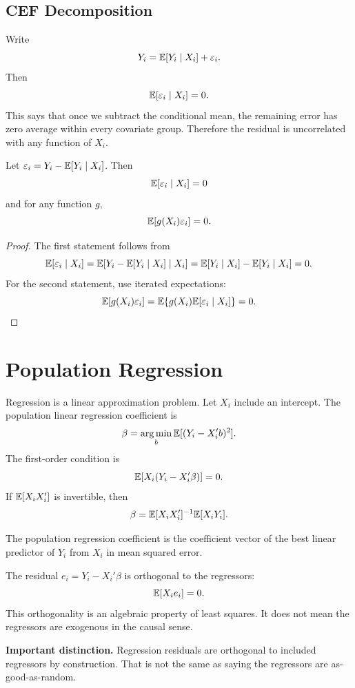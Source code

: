 \subsection{CEF Decomposition}

Write
\[
    Y_i = \mathbb{E}[Y_i\mid X_i] + \varepsilon_i.
\]
Then
\[
    \mathbb{E}[\varepsilon_i\mid X_i]=0.
\]
This says that once we subtract the conditional mean, the remaining error has
zero average within every covariate group. Therefore the residual is uncorrelated
with any function of \(X_i\).

\begin{thmN}
Let \(\varepsilon_i=Y_i-\mathbb{E}[Y_i\mid X_i]\). Then
\[
    \mathbb{E}[\varepsilon_i\mid X_i]=0
\]
and for any function \(g\),
\[
    \mathbb{E}[g(X_i)\varepsilon_i]=0.
\]
\end{thmN}

\begin{proof}
The first statement follows from
\[
    \mathbb{E}[\varepsilon_i\mid X_i]
    =
    \mathbb{E}[Y_i-\mathbb{E}[Y_i\mid X_i]\mid X_i]
    =
    \mathbb{E}[Y_i\mid X_i]-\mathbb{E}[Y_i\mid X_i]
    =
    0.
\]
For the second statement, use iterated expectations:
\[
    \mathbb{E}[g(X_i)\varepsilon_i]
    =
    \mathbb{E}\{g(X_i)\mathbb{E}[\varepsilon_i\mid X_i]\}=0.
\]
\end{proof}

\section{Population Regression}

Regression is a linear approximation problem. Let \(X_i\) include an intercept.
The population linear regression coefficient is
\[
    \beta
    =
    \operatorname*{arg\,min}_b \mathbb{E}[(Y_i-X_i'b)^2].
\]
The first-order condition is
\[
    \mathbb{E}[X_i(Y_i-X_i'\beta)]=0.
\]
If \(\mathbb{E}[X_iX_i']\) is invertible, then
\[
    \beta = \mathbb{E}[X_iX_i']^{-1}\mathbb{E}[X_iY_i].
\]

\begin{defN}
The population regression coefficient is the coefficient vector of the best
linear predictor of \(Y_i\) from \(X_i\) in mean squared error.
\end{defN}

The residual \(e_i=Y_i-X_i'\beta\) is orthogonal to the regressors:
\[
    \mathbb{E}[X_i e_i]=0.
\]
This orthogonality is an algebraic property of least squares. It does not mean
the regressors are exogenous in the causal sense.

\begin{boxF}
\textbf{Important distinction.} Regression residuals are orthogonal to included
regressors by construction. That is not the same as saying the regressors are
as-good-as-random.
\end{boxF}

